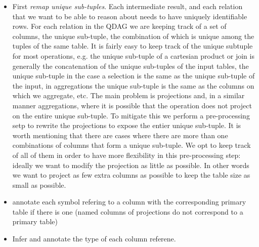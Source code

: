 \begin{itemize}
\item First \emph{remap unique sub-tuples}. Each intermediate result, and each
  relation that we want to be able to reason about needs to have
  uniquely identifiable rows. For each relation in the QDAG we are
  keeping track of a set of columns, the unique sub-tuple, the
  combination of which is unique among the tuples of the same
  table. It is fairly easy to keep track of the unique subtuple for
  most operations, e.g. the unique sub-tuple of a cartesian product or
  join is generally the concatenation of the unique sub-tuples of the
  input tables, the unique sub-tuple in the case a selection is the
  same as the unique sub-tuple of the input, in aggregations the
  unique sub-tuple is the same as the columns on which we aggregate,
  etc. The main problem is projections and, in a similar manner
  aggregations, where it is possible that the operation does not
  project on the entire unique sub-tuple. To mitigate this we perform
  a pre-processing setp to rewrite the projections to expose the
  entier unique sub-tuple. It is worth mentioning that there are cases
  where there are more than one combinations of columns that form a
  unique sub-tuple. We opt to keep track of all of them in order to
  have more flexibility in this pre-processing step: ideally we want
  to modify the projection as little as possible. In other words we
  want to project as few extra columns as possible to keep the table
  size as small as possible.
\item annotate each symbol refering to a column with the corresponding
  primary table if there is one (named columns of projections do not
  correspond to a primary table)
\item Infer and annotate the type of each column referene.
\end{itemize}


